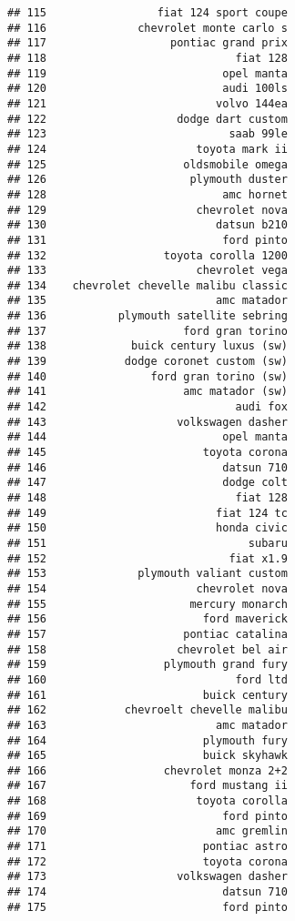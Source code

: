 \documentclass[
]{article}
\begin{document}
\begin{verbatim}
## 115                 fiat 124 sport coupe
## 116              chevrolet monte carlo s
## 117                   pontiac grand prix
## 118                             fiat 128
## 119                           opel manta
## 120                           audi 100ls
## 121                          volvo 144ea
## 122                    dodge dart custom
## 123                            saab 99le
## 124                       toyota mark ii
## 125                     oldsmobile omega
## 126                      plymouth duster
## 128                           amc hornet
## 129                       chevrolet nova
## 130                          datsun b210
## 131                           ford pinto
## 132                  toyota corolla 1200
## 133                       chevrolet vega
## 134    chevrolet chevelle malibu classic
## 135                          amc matador
## 136           plymouth satellite sebring
## 137                     ford gran torino
## 138             buick century luxus (sw)
## 139            dodge coronet custom (sw)
## 140                ford gran torino (sw)
## 141                     amc matador (sw)
## 142                             audi fox
## 143                    volkswagen dasher
## 144                           opel manta
## 145                        toyota corona
## 146                           datsun 710
## 147                           dodge colt
## 148                             fiat 128
## 149                          fiat 124 tc
## 150                          honda civic
## 151                               subaru
## 152                            fiat x1.9
## 153              plymouth valiant custom
## 154                       chevrolet nova
## 155                      mercury monarch
## 156                        ford maverick
## 157                     pontiac catalina
## 158                    chevrolet bel air
## 159                  plymouth grand fury
## 160                             ford ltd
## 161                        buick century
## 162            chevroelt chevelle malibu
## 163                          amc matador
## 164                        plymouth fury
## 165                        buick skyhawk
## 166                  chevrolet monza 2+2
## 167                      ford mustang ii
## 168                       toyota corolla
## 169                           ford pinto
## 170                          amc gremlin
## 171                        pontiac astro
## 172                        toyota corona
## 173                    volkswagen dasher
## 174                           datsun 710
## 175                           ford pinto

\end{verbatim}
\end{document}
